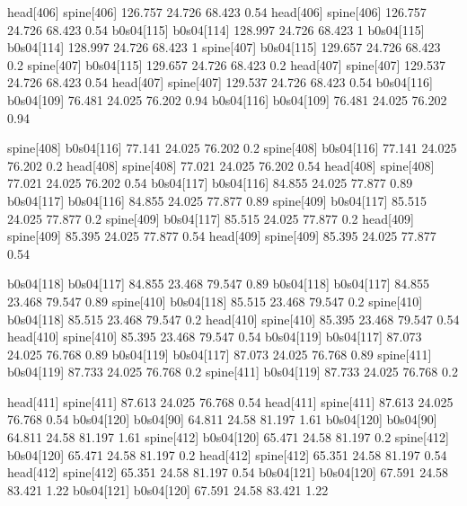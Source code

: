 head[406]    spine[406]    126.757    24.726    68.423    0.54
head[406]    spine[406]    126.757    24.726    68.423    0.54
b0s04[115]    b0s04[114]    128.997    24.726    68.423    1
b0s04[115]    b0s04[114]    128.997    24.726    68.423    1
spine[407]    b0s04[115]    129.657    24.726    68.423    0.2
spine[407]    b0s04[115]    129.657    24.726    68.423    0.2
head[407]    spine[407]    129.537    24.726    68.423    0.54
head[407]    spine[407]    129.537    24.726    68.423    0.54
b0s04[116]    b0s04[109]    76.481    24.025    76.202    0.94
b0s04[116]    b0s04[109]    76.481    24.025    76.202    0.94


spine[408]    b0s04[116]    77.141    24.025    76.202    0.2
spine[408]    b0s04[116]    77.141    24.025    76.202    0.2
head[408]    spine[408]    77.021    24.025    76.202    0.54
head[408]    spine[408]    77.021    24.025    76.202    0.54
b0s04[117]    b0s04[116]    84.855    24.025    77.877    0.89
b0s04[117]    b0s04[116]    84.855    24.025    77.877    0.89
spine[409]    b0s04[117]    85.515    24.025    77.877    0.2
spine[409]    b0s04[117]    85.515    24.025    77.877    0.2
head[409]    spine[409]    85.395    24.025    77.877    0.54
head[409]    spine[409]    85.395    24.025    77.877    0.54


b0s04[118]    b0s04[117]    84.855    23.468    79.547    0.89
b0s04[118]    b0s04[117]    84.855    23.468    79.547    0.89
spine[410]    b0s04[118]    85.515    23.468    79.547    0.2
spine[410]    b0s04[118]    85.515    23.468    79.547    0.2
head[410]    spine[410]    85.395    23.468    79.547    0.54
head[410]    spine[410]    85.395    23.468    79.547    0.54
b0s04[119]    b0s04[117]    87.073    24.025    76.768    0.89
b0s04[119]    b0s04[117]    87.073    24.025    76.768    0.89
spine[411]    b0s04[119]    87.733    24.025    76.768    0.2
spine[411]    b0s04[119]    87.733    24.025    76.768    0.2


head[411]    spine[411]    87.613    24.025    76.768    0.54
head[411]    spine[411]    87.613    24.025    76.768    0.54
b0s04[120]    b0s04[90]    64.811    24.58    81.197    1.61
b0s04[120]    b0s04[90]    64.811    24.58    81.197    1.61
spine[412]    b0s04[120]    65.471    24.58    81.197    0.2
spine[412]    b0s04[120]    65.471    24.58    81.197    0.2
head[412]    spine[412]    65.351    24.58    81.197    0.54
head[412]    spine[412]    65.351    24.58    81.197    0.54
b0s04[121]    b0s04[120]    67.591    24.58    83.421    1.22
b0s04[121]    b0s04[120]    67.591    24.58    83.421    1.22


